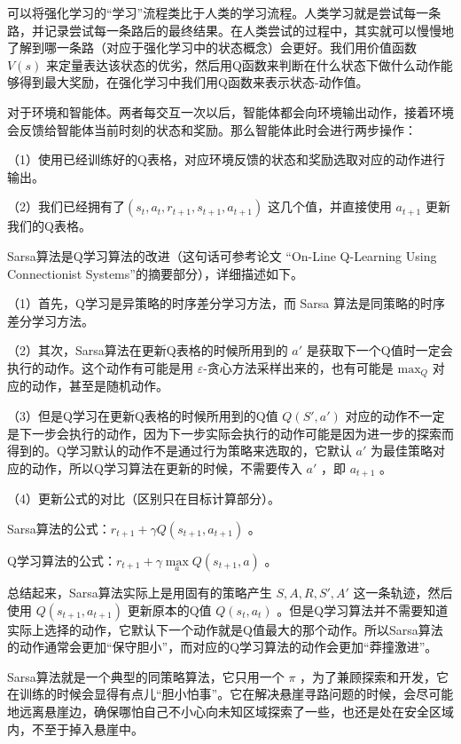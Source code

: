
可以将强化学习的“学习”流程类比于人类的学习流程。人类学习就是尝试每一条路，并记录尝试每一条路后的最终结果。在人类尝试的过程中，其实就可以慢慢地了解到哪一条路（对应于强化学习中的状态概念）会更好。我们用价值函数 $V(s)$ 来定量表达该状态的优劣，然后用Q函数来判断在什么状态下做什么动作能够得到最大奖励，在强化学习中我们用Q函数来表示状态-动作值。


对于环境和智能体。两者每交互一次以后，智能体都会向环境输出动作，接着环境会反馈给智能体当前时刻的状态和奖励。那么智能体此时会进行两步操作：
	
（1）使用已经训练好的Q表格，对应环境反馈的状态和奖励选取对应的动作进行输出。

（2）我们已经拥有了$(s_{t}, a_{t}, r_{t+1}, s_{t+1}, a_{t+1})$  这几个值，并直接使用 $a_{t+1}$ 更新我们的Q表格。


Sarsa算法是Q学习算法的改进（这句话可参考论文 “On-Line Q-Learning Using Connectionist Systems”的摘要部分），详细描述如下。

（1）首先，Q学习是异策略的时序差分学习方法，而 Sarsa 算法是同策略的时序差分学习方法。

（2）其次，Sarsa算法在更新Q表格的时候所用到的 $a'$ 是获取下一个Q值时一定会执行的动作。这个动作有可能是用 $\varepsilon$-贪心方法采样出来的，也有可能是 $\mathrm{max}_Q$ 对应的动作，甚至是随机动作。

（3）但是Q学习在更新Q表格的时候所用到的Q值 $Q(S',a')$ 对应的动作不一定是下一步会执行的动作，因为下一步实际会执行的动作可能是因为进一步的探索而得到的。Q学习默认的动作不是通过行为策略来选取的，它默认 $a'$ 为最佳策略对应的动作，所以Q学习算法在更新的时候，不需要传入 $a'$ ，即 $a_{t+1}$ 。

（4）更新公式的对比（区别只在目标计算部分）。

Sarsa算法的公式：$r_{t+1}+\gamma Q(s_{t+1}, a_{t+1})$ 。

Q学习算法的公式：$r_{t+1}+\gamma \underset{a}{\max} Q\left(s_{t+1}, a\right)$ 。

总结起来，Sarsa算法实际上是用固有的策略产生 {$S,A,R,S',A'$} 这一条轨迹，然后使用 $Q(s_{t+1},a_{t+1})$ 更新原本的Q值 $Q(s_t,a_t)$ 。但是Q学习算法并不需要知道实际上选择的动作，它默认下一个动作就是Q值最大的那个动作。所以Sarsa算法的动作通常会更加“保守胆小”，而对应的Q学习算法的动作会更加“莽撞激进”。


Sarsa算法就是一个典型的同策略算法，它只用一个 $\pi$ ，为了兼顾探索和开发，它在训练的时候会显得有点儿“胆小怕事”。它在解决悬崖寻路问题的时候，会尽可能地远离悬崖边，确保哪怕自己不小心向未知区域探索了一些，也还是处在安全区域内，不至于掉入悬崖中。

